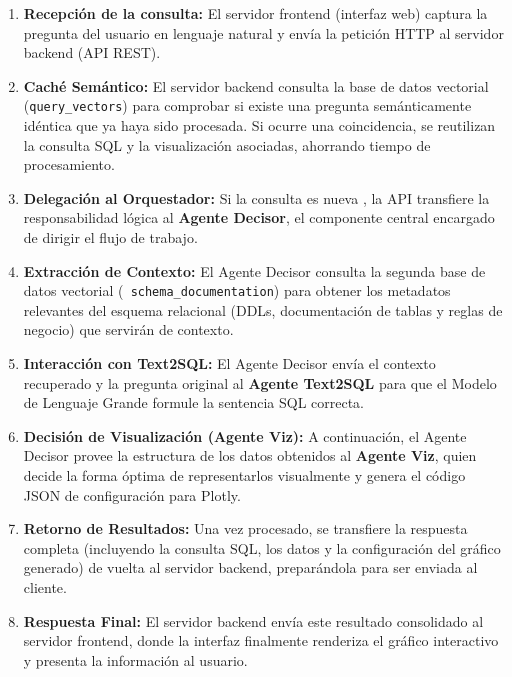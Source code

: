 \begin{enumerate}
      \item \textbf{Recepción de la consulta:} El servidor frontend (interfaz web)
            captura la pregunta del usuario en lenguaje natural y envía la petición HTTP
            al servidor backend (API REST).

      \item \textbf{Caché Semántico:} El servidor backend
            consulta la base de datos vectorial (\texttt{query\_vectors}) para
            comprobar si existe una pregunta semánticamente idéntica que ya haya sido
            procesada. Si ocurre una coincidencia, se reutilizan la consulta SQL y la visualización
            asociadas, ahorrando tiempo de procesamiento.

      \item \textbf{Delegación al Orquestador:} Si la consulta es nueva
            , la API transfiere la responsabilidad lógica al
            \textbf{Agente Decisor}, el componente central encargado de dirigir el flujo
            de trabajo.

      \item \textbf{Extracción de Contexto:} El
            Agente Decisor consulta la segunda base de datos vectorial (\texttt{
                  schema\_documentation}) para obtener los metadatos relevantes del esquema
            relacional (DDLs, documentación de tablas y reglas de negocio) que servirán de
            contexto.

      \item \textbf{Interacción con Text2SQL:} El Agente Decisor envía el contexto
            recuperado y la pregunta original al \textbf{Agente Text2SQL} para que el Modelo de Lenguaje Grande formule la sentencia SQL
            correcta.

      \item \textbf{Decisión de Visualización (Agente Viz):} A continuación, el Agente Decisor provee la estructura de los datos
            obtenidos al \textbf{Agente Viz}, quien decide la forma óptima de
            representarlos visualmente y genera el código JSON de configuración para
            Plotly.

      \item \textbf{Retorno de Resultados:} Una vez procesado, se transfiere la
            respuesta completa (incluyendo la consulta SQL, los datos y la configuración
            del gráfico generado) de vuelta al servidor backend, preparándola para ser
            enviada al cliente.

      \item \textbf{Respuesta Final:} El servidor backend envía este resultado
            consolidado al servidor frontend, donde la interfaz finalmente renderiza el
            gráfico interactivo y presenta la información al usuario.
\end{enumerate}

